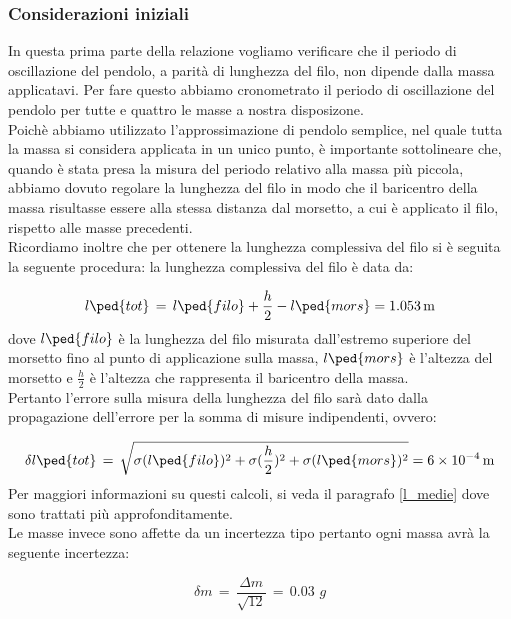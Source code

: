 \subsubsection{Considerazioni iniziali}
In questa prima parte della relazione vogliamo verificare che il periodo di oscillazione del pendolo, a parità di lunghezza del filo, non dipende dalla massa applicatavi.
Per fare questo abbiamo cronometrato il periodo di oscillazione del pendolo per tutte e quattro le masse a nostra disposizone.\\
Poichè abbiamo utilizzato l'approssimazione di pendolo semplice, nel quale tutta la massa si considera applicata in un unico punto, è importante sottolineare che, quando è stata presa la misura del periodo relativo alla massa più piccola, abbiamo dovuto regolare la lunghezza del filo in modo che il baricentro della massa risultasse essere alla stessa distanza dal morsetto, a cui è applicato il filo, rispetto alle masse precedenti.\\
Ricordiamo inoltre che per ottenere la lunghezza complessiva del filo si è seguita la seguente procedura: la lunghezza complessiva del filo è data da:

\begin{equation}
	l\ped{tot} \,=\, l\ped{filo} + \frac{h}{2} - l\ped{mors} = \SI{1.053}{\meter}
\end{equation}
%
dove $l\ped{filo}$ è la lunghezza del filo misurata dall'estremo superiore del morsetto fino al punto di applicazione sulla massa, $l\ped{mors}$ è l'altezza del morsetto e $\frac{h}{2}$ è l'altezza che rappresenta il baricentro della massa.\\
Pertanto l'errore sulla misura della lunghezza del filo sarà dato dalla propagazione dell'errore per la somma di misure indipendenti, ovvero:

\begin{equation*}
	\delta l\ped{tot} \,=\, \sqrt{\sigma (l\ped{filo})^2 + \sigma (\frac{h}{2})^2 + \sigma (l\ped{mors})^2} = \SI{6e-4}{\meter}
\end{equation*}
%
Per maggiori informazioni su questi calcoli, si veda il paragrafo \ref{l_medie} dove sono trattati più approfonditamente.\\
%
Le masse invece sono affette da un incertezza tipo pertanto ogni massa avrà la seguente incertezza:

\begin{equation*}
	\delta m \,=\, \frac{\Delta m}{\sqrt{12}} \,=\, 0.03 \,\, g
\end{equation*}

